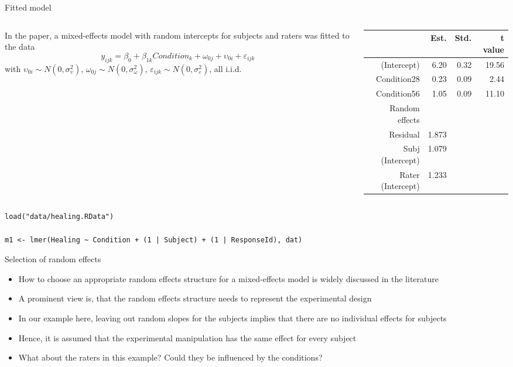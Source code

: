 \documentclass[aspectratio=169]{beamer}
\begin{document}
\begin{frame}[fragile]{Fitted model}
  \begin{columns}
    \begin{column}{.5\textwidth}
    In the paper, a mixed-effects model with random intercepts for subjects and
      raters was fitted to the data
     \[
       y_{ijk} = \beta_0 + \beta_{1k} Condition_k + \omega_{0j} + \upsilon_{0i} +
       \varepsilon_{ijk}
  \]
\small
      with $\upsilon_{0i} \sim N(0, \sigma_{\upsilon}^2)$,
  $\omega_{0j} \sim N(0, \sigma_{\omega}^2)$, $\varepsilon_{ijk} \sim N(0,
  \sigma_{\varepsilon}^2)$, all i.i.d. 
    \end{column}
    \begin{column}{.5\textwidth}
\begin{tabular}{rrrr}
  \hline
 & Est. & Std. & t value \\ 
  \hline
(Intercept) & 6.20 & 0.32 & 19.56 \\ 
  Condition28 & 0.23 & 0.09 & 2.44 \\ 
  Condition56 & 1.05 & 0.09 & 11.10 \\ 
   \hline
   Random effects & & & \\
   \hline
   Residual & 1.873 & & \\
   Subj (Intercept) & 1.079 & & \\
   Rater (Intercept) & 1.233 & & \\
   \hline
\end{tabular}
    \end{column}
  \end{columns}
  \vspace{.5cm}
\begin{lstlisting}
load("data/healing.RData")

m1 <- lmer(Healing ~ Condition + (1 | Subject) + (1 | ResponseId), dat)
\end{lstlisting}
\end{frame}

\begin{frame}[<+->]{Selection of random effects}
  \begin{itemize}
    \item How to choose an appropriate random effects structure for a
      mixed-effects model is widely discussed in the literature
      \citep[e.\,g.,][]{Barr2013, Gelman2024, Bates2018}
    \item A prominent view is, that the random effects structure needs to
      represent the experimental design
    \item In our example here, leaving out random slopes for the subjects
      implies that there are no individual effects for subjects
    \item Hence, it is assumed that the experimental manipulation has the same
      effect for every subject
    \item What about the raters in this example? Could they be influenced by
      the conditions?
  \end{itemize}
\end{frame}
\end{document}
